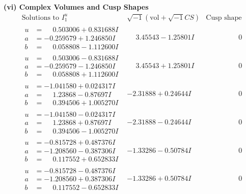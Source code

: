 \documentclass[1p]{elsarticle_modified}
\theoremstyle{definition}
\newcommand{\I}{\sqrt{-1}}
\begin{document}
\newpage\flushleft \textbf{(vi) Complex Volumes and Cusp Shapes}
$$\begin{array}{c|c|c}  
\text{Solutions to }I^u_{1}& \I (\text{vol} + \sqrt{-1}CS) & \text{Cusp shape}\\
 \hline 
\begin{aligned}
u &= \phantom{-}0.503006 + 0.831688 I \\
a &= -0.259579 + 1.246850 I \\
b &= \phantom{-}0.058808 - 1.112600 I\end{aligned}
 & \phantom{-}3.45543 - 1.25801 I & \phantom{-0.000000 } 0 \\ \hline\begin{aligned}
u &= \phantom{-}0.503006 - 0.831688 I \\
a &= -0.259579 - 1.246850 I \\
b &= \phantom{-}0.058808 + 1.112600 I\end{aligned}
 & \phantom{-}3.45543 + 1.25801 I & \phantom{-0.000000 } 0 \\ \hline\begin{aligned}
u &= -1.041580 + 0.024317 I \\
a &= \phantom{-}1.23868 - 0.87697 I \\
b &= \phantom{-}0.394506 + 1.005270 I\end{aligned}
 & -2.31888 + 0.24644 I & \phantom{-0.000000 } 0 \\ \hline\begin{aligned}
u &= -1.041580 - 0.024317 I \\
a &= \phantom{-}1.23868 + 0.87697 I \\
b &= \phantom{-}0.394506 - 1.005270 I\end{aligned}
 & -2.31888 - 0.24644 I & \phantom{-0.000000 } 0 \\ \hline\begin{aligned}
u &= -0.815728 + 0.487376 I \\
a &= -1.208560 - 0.387306 I \\
b &= \phantom{-}0.117552 + 0.652833 I\end{aligned}
 & -1.33286 - 0.50784 I & \phantom{-0.000000 } 0 \\ \hline\begin{aligned}
u &= -0.815728 - 0.487376 I \\
a &= -1.208560 + 0.387306 I \\
b &= \phantom{-}0.117552 - 0.652833 I\end{aligned}
 & -1.33286 + 0.50784 I & \phantom{-0.000000 } 0 \\ \hline\begin{aligned}

\end{aligned}
\end{array}$$
\end{document}
